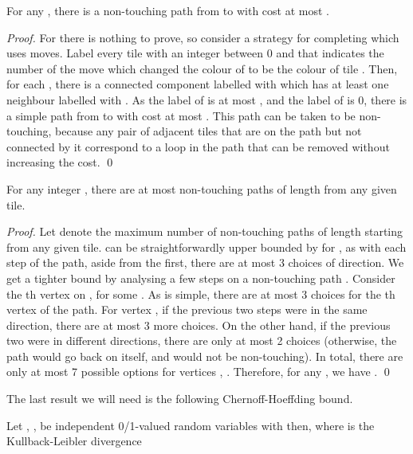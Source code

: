 \documentclass[a4paper,11pt]{llncs}
\newcounter{l}
\begin{document}
\begin{lemma}
    \label{lem:pathcost}
    For any , there is a non-touching path from  to  with cost at most .
\end{lemma}

\begin{proof}
    For  there is nothing to prove, so consider a strategy for completing  which uses  moves. Label every tile  with an integer  between 0 and  that indicates the number of the move which changed the colour of  to be the colour of tile . Then, for each , there is a connected component labelled with  which has at least one neighbour labelled with . As the label of  is at most , and the label of  is 0, there is a simple path from  to  with cost at most . This path can be taken to be non-touching, because any pair of adjacent tiles  that are on the path but not connected by it correspond to a loop in the path that can be removed without increasing the cost.
    \qed
\end{proof}

\begin{lemma}
    \label{lem:pathcount}
    For any integer , there are at most  non-touching paths of length  from any given tile.
\end{lemma}

\begin{proof}
    Let  denote the maximum number of non-touching paths of length  starting from any given tile.  can be straightforwardly upper bounded by  for , as with each step of the path, aside from the first, there are at most 3 choices of direction. We get a tighter bound by analysing a few steps on a non-touching path . Consider the th vertex on , for some . As  is simple, there are at most 3 choices for the th vertex of the path. For vertex , if the previous two steps were in the same direction, there are at most 3 more choices. On the other hand, if the previous two were in different directions, there are only at most 2 choices (otherwise, the path would go back on itself, and would not be non-touching). In total, there are only at most 7 possible options for vertices , . Therefore, for any , we have .
    \qed
\end{proof}

\noindent The last result we will need is the following Chernoff-Hoeffding bound.

\begin{fact}
    \label{fact:chernoff}
    Let , , be independent 0/1-valued random variables with  then,  where  is the Kullback-Leibler divergence 
\end{fact}
\end{document}
